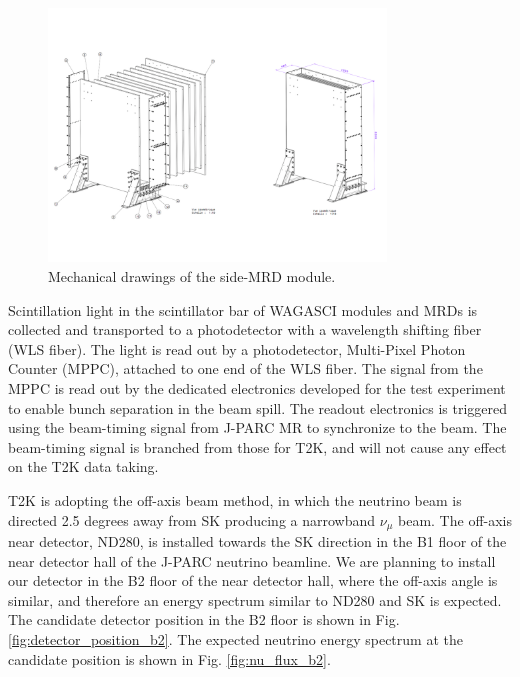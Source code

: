 \begin{figure}%
  \begin{center}
  \includegraphics[width=0.8\textwidth]{figs/mec_drawing_side_mrd.pdf}
  \caption{Mechanical drawings of the side-MRD module.}
  \label{fig:med_drawing_side_mrd}
  \end{center}
\end{figure}


Scintillation light in the scintillator bar of WAGASCI modules and MRDs is collected and transported to a photodetector with a wavelength shifting fiber (WLS fiber).
The light is read out by a photodetector, Multi-Pixel Photon Counter (MPPC), attached to one end of the 
WLS fiber.
The signal from the MPPC is read out by the dedicated electronics developed for the test experiment
to enable bunch separation in the beam spill.
The readout electronics is triggered using the beam-timing signal from J-PARC MR to synchronize to the beam.
The beam-timing signal is branched from those for T2K, and will not cause any effect on the T2K data taking.


T2K is adopting the off-axis beam method, in which the neutrino beam is directed 2.5 degrees
away from SK producing a narrowband $\nu_{\mu}$ beam.
The off-axis near detector, ND280, is installed towards the SK direction in the B1 floor of the near detector hall of the J-PARC neutrino beamline.
We are planning to install our detector in the B2 floor of the near detector hall,
where the off-axis angle is similar, and therefore an energy spectrum similar to ND280 and SK is expected.
The candidate detector position in the B2 floor is shown in Fig. \ref{fig:detector_position_b2}.
The expected neutrino energy spectrum at the candidate position is shown in Fig. \ref{fig:nu_flux_b2}.


